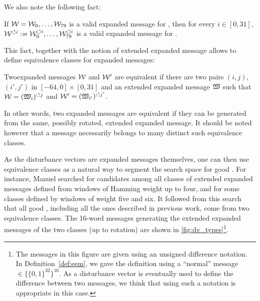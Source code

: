 We also note the following fact:
\begin{fact}
If $\expmess = \expmess_0, \ldots,\linebreak \expmess_{79}$ is a valid expanded message for \shaone, then for every $i \in [0, 31]$, $\mathcal{W}^{\circlearrowleft i} :=
\mathcal{W}_0^{\circlearrowleft i}, \ldots, \mathcal{W}_{79}^{\circlearrowleft i}$ is a valid expanded message for \shaone.
\end{fact}
This fact, together with the notion of extended expanded message allows to define equivalence classes for expanded messages:
\begin{defi}
Two\linebreak \shaone expanded messages $\mathcal{W}$ and $\mathcal{W}'$ are equivalent if there are two pairs $(i,j)$, $(i',j')$ in $[-64, 0] \times [0, 31]$
and an extended expanded message $\mathfrak{W}$ such that $\mathcal{W} = (\mathfrak{W}_i)^{\circlearrowleft j}$ and $\mathcal{W}' = (\mathfrak{W}_{i'})^{\circlearrowleft j'}$.
\end{defi}
In other words, two expanded messages are equivalent if they can be generated from the same, possibly rotated, extended expanded message. It should be noted
however that a message necessarily belongs to many distinct such equivalence classes.

As the disturbance vectors are expanded messages themselves, one can then use equivalence classes as a natural way to segment the search space for good \dvs. For instance,
Manuel searched for candidates among all classes of extended expanded messages defined from windows of Hamming weight up to four, and for some classes defined by
windows of weight five and six. It followed from this search that all good \dvs, including all the ones described in previous work, come from two equivalence classes.
The 16-word messages generating the extended expanded messages of the two classes (up to rotation) are shown in \autoref{fig:dv_types}\footnote{The messages in this
figure are given using an unsigned difference notation. In Definition~\ref{def:eem}, we gave the definition using a ``normal'' message $\in \{\{0,1\}^{32}\}^{16}$. As
a disturbance vector is eventually used to define the difference between two messages, we think that using such a notation is appropriate in this case.}.

